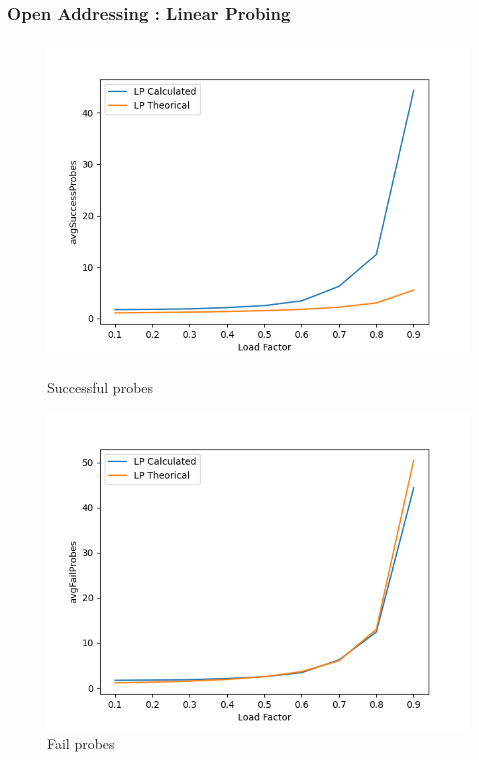\documentclass{article}
\begin{document}
    \subsubsection*{Open Addressing : Linear Probing}
    
        \begin{figure}[H]
              \includegraphics[width=\linewidth]{images/loadFactor_vs_avgSuccessProbes_LP.png}
              \caption{Successful probes}\label{fig:plot4}
            \endminipage\hfill
              \includegraphics[width=\linewidth]{images/loadFactor_vs_avgFailProbes_LP.png}
              \caption{Fail probes}\label{fig:plot5}
            \endminipage
        \end{figure}
        
\end{document}
